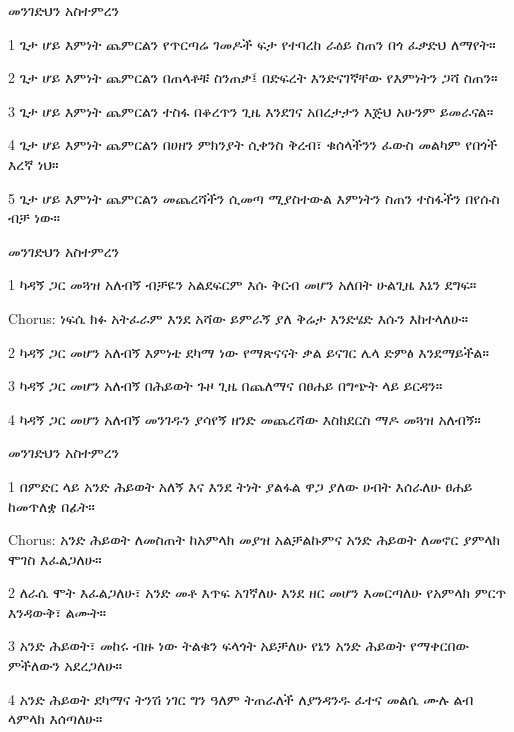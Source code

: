 \documentclass[12pt]{article}
\begin{document}
\begin{hymn}{4}{መንገድህን አስተምረን}
\begin{stanza}
1 ጌታ ሆይ እምነት ጨምርልን
የጥርጣሬ ገመዶች ፍታ
የተባረከ ራዕይ ስጠን 
በጎ ፈቃድህ ለማየት።
\end{stanza}
\begin{stanza}
2 ጌታ ሆይ እምነት ጨምርልን
በጠላቶቹ ስንጠቃ፤
በድፍረት እንድናገኛቸው
የእምነትን ጋሻ ስጠን።
\end{stanza}
\begin{stanza}
3 ጌታ ሆይ እምነት ጨምርልን
ተስፋ በቆረጥን ጊዜ
እንደገና አበረታታን
እጅህ አሁንም ይመራናል።
\end{stanza}
\begin{stanza}
4 ጌታ ሆይ እምነት ጨምርልን
በሀዘን ምክንያት ሲቀንስ 
ቅረብ፣ ቁሰላችንን ፈውስ
መልካም የበጎች እረኛ ነህ።
\end{stanza}
\begin{stanza}
5 ጌታ ሆይ እምነት ጨምርልን
መጨረሻችን ሲመጣ
ሚያስተውል እምነትን ስጠን
ተስፋችን በየሱስ ብቻ ነው።
\end{stanza}
\end{hymn}

\begin{hymn}{4}{መንገድህን አስተምረን}
\begin{stanza}
1 ካዳኝ ጋር መጓዝ አለብኝ
ብቻዬን አልደፍርም
እሱ ቅርብ መሆን አለበት
ሁልጊዜ እኔን ደግፍ።
\end{stanza}
\begin{chorus}
Chorus: ነፍሴ ክፉ አትፈራም
እንደ አሻው ይምራኝ
ያለ ቅሬታ እንድሄድ
እሱን እከተላለሁ።
\end{chorus}
\begin{stanza}
2 ካዳኝ ጋር መሆን አለብኝ
እምነቴ ደካማ ነው
የማጽናናት ቃል ይናገር
ሌላ ድምፅ እንደማይችል።
\end{stanza}
\begin{stanza}
3 ካዳኝ ጋር መሆን አለብኝ
በሕይወት ጉዞ ጊዜ
በጨለማና በፀሐይ
በግጭት ላይ ይርዳን።
\end{stanza}
\begin{stanza}
4 ካዳኝ ጋር መሆን አለብኝ
መንገዱን ያሳየኝ ዘንድ
መጨረሻው እስክደርስ
ማዶ መጓዝ አለብኝ።
\end{stanza}
\end{hymn}

\begin{hymn}{4}{መንገድህን አስተምረን}
\begin{stanza}
1 በምድር ላይ አንድ ሕይወት አለኝ
እና እንደ ትነት ያልፋል
ዋጋ ያለው ሀብት እሰራለሁ
ፀሐይ ከመጥለቋ በፊት።
\end{stanza}
\begin{chorus}
Chorus: አንድ ሕይወት ለመስጠት
ከአምላክ መያዝ አልቻልኩምና
አንድ ሕይወት ለመኖር
ያምላክ ሞገስ እፈልጋለሁ።
\end{chorus}
\begin{stanza}
2 ለራሴ ሞት እፈልጋለሁ፣
አንድ መቶ እጥፍ አገኛለሁ
እንደ ዘር መሆን እመርጣለሁ
የአምላክ ምርጥ እንዳውቅ፣ ልሙት።
\end{stanza}
\begin{stanza}
3 አንድ ሕይወት፣ መከሩ ብዙ ነው
ትልቁን ፍላጎት አይቻለሁ
የኔን አንድ ሕይወት የማቀርበው
ምችለውን አደረጋለሁ።
\end{stanza}
\begin{stanza}
4 አንድ ሕይወት ደካማና ትንሽ
ነገር ግን ዓለም ትጠራለች
ለያንዳንዱ ፈተና መልሴ
ሙሉ ልብ ላምላክ እሰጣለሁ።
\end{stanza}
\end{hymn}
\end{document}
